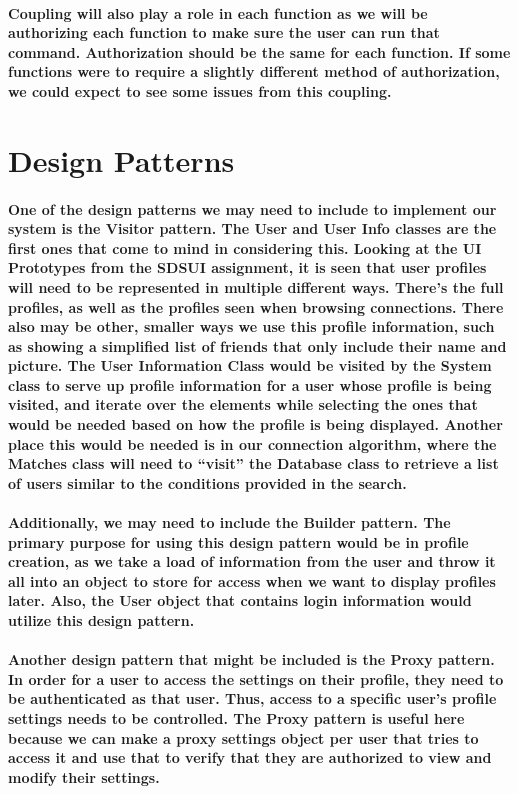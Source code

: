 \documentclass[12pt]{article}
\begin{document}
  \paragraph{\normalfont \indent Coupling will also play a role in each function as we will be authorizing each function to make sure the user can run that command. Authorization should be the same for each function. If some functions were to require a slightly different method of authorization, we could expect to see some issues from this coupling.
  }

\section{\bf Design Patterns}
  \paragraph{\normalfont \indent One of the design patterns we may need to include to implement our system is the Visitor pattern. The User and User Info classes are the first ones that come to mind in considering this. Looking at the UI Prototypes from the SDSUI assignment, it is seen that user profiles will need to be represented in multiple different ways. There’s the full profiles, as well as the profiles seen when browsing connections. There also may be other, smaller ways we use this profile information, such as showing a simplified list of friends that only include their name and picture. The User Information Class would be visited by the System class to serve up profile information for a user whose profile is being visited, and iterate over the elements while selecting the ones that would be needed based on how the profile is being displayed. Another place this would be needed is in our connection algorithm, where the Matches class will need to “visit” the Database class to retrieve a list of users similar to the conditions provided in the search.
  }
  \paragraph{\normalfont \indent Additionally, we may need to include the Builder pattern. The primary purpose for using this design pattern would be in profile creation, as we take a load of information from the user and throw it all into an object to store for access when we want to display profiles later. Also, the User object that contains login information would utilize this design pattern.
  }
  \paragraph{\normalfont \indent Another design pattern that might be included is the Proxy pattern. In order for a user to access the settings on their profile, they need to be authenticated as that user. Thus, access to a specific user’s profile settings needs to be controlled. The Proxy pattern is useful here because we can make a proxy settings object per user that tries to access it and use that to verify that they are authorized to view and modify their settings.
  }
\end{document}
